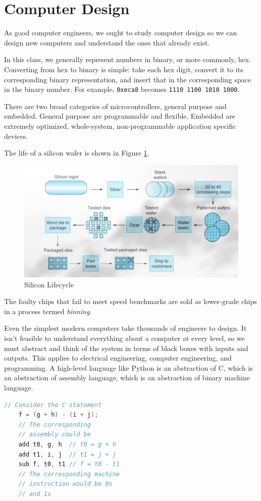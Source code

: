 \section{Computer Design}

As good computer engineers, we ought to study computer
design so we can design new computers and understand
the ones that already exist.

In this class, we generally represent numbers in
binary, or more commonly, hex. Converting from
hex to binary is simple: take each hex digit, convert
it to its corresponding binary representation, and
insert that in the corresponding space in the binary
number. For example, \texttt{0xeca8} becomes
\texttt{1110 1100 1010 1000}.

There are two broad categories of microcontrollers,
general purpose and embedded. General purpose are
programmable and flexible. Embedded are extremely
optimized, whole-system, non-programmable application
specific devices.

The life of a silicon wafer is shown in Figure
\ref{fig:silicon}.
\begin{figure}
    \includegraphics{images/silicon.png}
    \caption{Silicon Lifecycle}
    \label{fig:silicon}
\end{figure}
The faulty chips that fail to meet speed benchmarks
are sold as lower-grade chips in a process termed
\emph{binning}.

Even the simplest modern computers take thousands
of engineers to design. It isn't feasible to
understand everything about a computer at every
level, so we must abstract and think of the system
in terms of black boxes with inputs and outputs. This
applies to electrical engineering, computer engineering,
and programming. A high-level language like Python is
an abstraction of C, which is an abstraction of assembly
language, which is an abstraction of binary machine language.
\begin{lstlisting}[language=C]
    // Consider the C statement
    f = (g + h) - (i + j);
    // The corresponding 
    // assembly could be
    add t0, g, h  // t0 = g + h
    add t1, i, j  // t1 = j + j
    sub f, t0, t1 // f = t0 - t1
    // The corresponding machine 
    // instruction would be 0s 
    // and 1s
\end{lstlisting}

